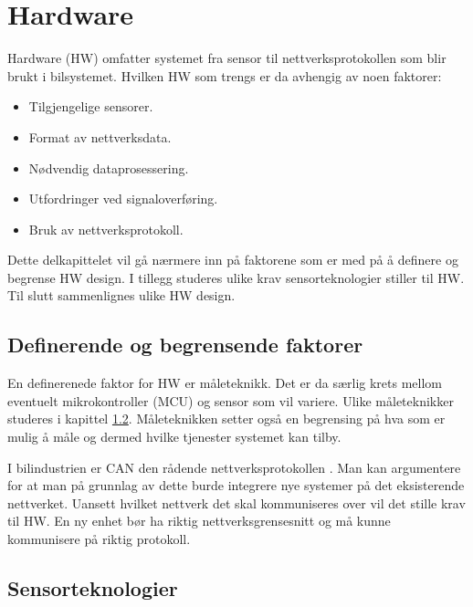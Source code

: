 \section{Hardware}

Hardware (HW) omfatter systemet fra sensor til nettverksprotokollen som blir brukt i
bilsystemet. Hvilken HW
som trengs er da avhengig av noen faktorer:
\begin{itemize}
\item Tilgjengelige sensorer.
\item Format av nettverksdata.
\item Nødvendig dataprosessering.
\item Utfordringer ved signaloverføring.
\item Bruk av nettverksprotokoll.
\end{itemize}

Dette delkapittelet vil gå nærmere inn på faktorene som er med på å definere og begrense HW design. I tillegg
studeres ulike krav sensorteknologier stiller til HW. Til slutt sammenlignes ulike HW design.


\subsection{Definerende og begrensende faktorer}

En definerenede faktor for HW er måleteknikk. Det er da særlig krets
mellom eventuelt mikrokontroller (MCU) og sensor som vil variere. Ulike måleteknikker studeres
i kapittel \ref{subsec:sensorteknologier}. Måleteknikken setter også en begrensing på hva som er
mulig å måle og dermed hvilke tjenester systemet kan tilby. 

I bilindustrien er CAN den rådende nettverksprotokollen \cite{canbus}. Man
kan argumentere for at man på grunnlag av dette burde integrere nye systemer på
det eksisterende nettverket. Uansett hvilket nettverk det skal kommuniseres over
vil det stille krav til HW. En ny enhet bør ha riktig nettverksgrensesnitt
og må kunne kommunisere på riktig protokoll. 

\subsection{Sensorteknologier}
\label{subsec:sensorteknologier}

